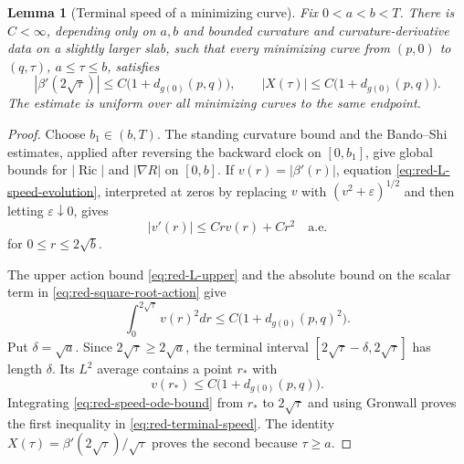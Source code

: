 \documentclass[10pt]{coll-l}
\newtheorem{lemma}[theorem]{Lemma}
\theoremstyle{definition}
\theoremstyle{remark}
\numberwithin{section}{chapter}
\numberwithin{equation}{chapter}
\newcommand{\Ric}{\operatorname{Ric}}
\begin{document}
\begin{lemma}[Terminal speed of a minimizing curve]
\label{lem:red-terminal-speed}
Fix $0<a<b<T$.  There is $C<\infty$, depending only on $a,b$ and bounded
curvature and curvature-derivative data on a slightly larger slab, such
that every minimizing curve from $(p,0)$ to $(q,\tau)$, $a\leq\tau\leq b$,
satisfies
\begin{equation}
 |\beta'(2\sqrt\tau)|\leq C\bigl(1+d_{g(0)}(p,q)\bigr),
 \qquad
 |X(\tau)|\leq C\bigl(1+d_{g(0)}(p,q)\bigr).           \label{eq:red-terminal-speed}
\end{equation}
The estimate is uniform over all minimizing curves to the same endpoint.
\end{lemma}

\begin{proof}
Choose $b_1\in(b,T)$.  The standing curvature bound and the Bando--Shi
estimates, applied after reversing the backward clock on $[0,b_1]$, give
global bounds for $|\Ric|$ and $|\nabla R|$ on $[0,b]$.  If
$v(r)=|\beta'(r)|$, equation \eqref{eq:red-L-speed-evolution}, interpreted
at zeros by replacing $v$ with $(v^2+\varepsilon)^{1/2}$ and then letting
$\varepsilon\downarrow0$, gives
\begin{equation}
                     |v'(r)|\leq C r v(r)+Cr^2
                     \quad\text{a.e.}                  \label{eq:red-speed-ode-bound}
\end{equation}
for $0\leq r\leq2\sqrt b$.

The upper action bound \eqref{eq:red-L-upper} and the absolute bound on the
scalar term in \eqref{eq:red-square-root-action} give
\begin{equation}
 \int_0^{2\sqrt\tau}v(r)^2dr
       \leq C\bigl(1+d_{g(0)}(p,q)^2\bigr).             \label{eq:red-minimizer-energy-growth}
\end{equation}
Put $\delta=\sqrt a$.  Since $2\sqrt\tau\geq2\sqrt a$, the terminal interval
$[2\sqrt\tau-\delta,2\sqrt\tau]$ has length $\delta$.  Its $L^2$ average
contains a point $r_*$ with
\begin{equation}
                   v(r_*)\leq C\bigl(1+d_{g(0)}(p,q)\bigr).  \label{eq:red-speed-average-point}
\end{equation}
Integrating \eqref{eq:red-speed-ode-bound} from $r_*$ to $2\sqrt\tau$ and
using Gronwall proves the first inequality in
\eqref{eq:red-terminal-speed}.  The identity
$X(\tau)=\beta'(2\sqrt\tau)/\sqrt\tau$ proves the second because
$\tau\geq a$.
\end{proof}
\end{document}
